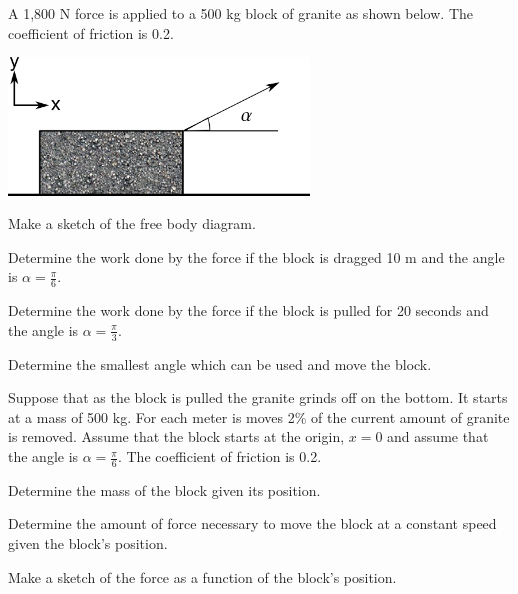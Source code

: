\begin{problem}
\item A 1,800 N force is applied to a 500 kg block of granite as
  shown below. The coefficient of friction is 0.2.

  \includegraphics[width=8cm]{ink/week7/dragBlock}

  \begin{subproblem}
    \item Make a sketch of the free body diagram.
      \vspace{6em}
    \item Determine the work done by the force if the block is dragged
      10 m and the angle is $\alpha=\frac{\pi}{6}$.  
      \vfill
    \item Determine the work done by the force if the block is pulled
      for 20 seconds and the angle is $\alpha=\frac{\pi}{3}$.  
      \vfill
    \item Determine the smallest angle which can be used and move the
      block.
      \vfill
  \end{subproblem}

  \clearpage

\item Suppose that as the block is pulled the granite grinds off on
  the bottom. It starts at a mass of 500 kg. For each meter is moves
  2\% of the current amount of granite is removed. Assume that the
  block starts at the origin, $x=0$ and assume that the angle is
  $\alpha=\frac{\pi}{6}$. The coefficient of friction is 0.2.

  \begin{subproblem}
  \item Determine the mass of the block given its position.
    \vfill
  \item Determine the amount of force necessary to move the block at a
    constant speed given the block's position.
    \vfill
  \item Make a sketch of the force as a function of the block's
    position.

    \vfill
  \end{subproblem}

\end{problem}

